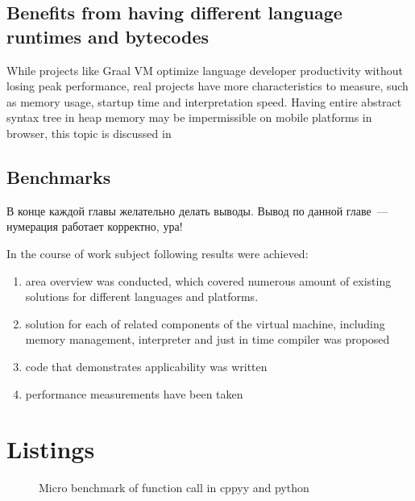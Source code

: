 \documentclass[times, %
	specification,annotation, %
	titlepage-extra-ru,specification-extra-ru,annotation-extra-ru, %
	languages={russian,english} %
	]{itmo-student-thesis}
\begin{document}
\section{Benefits from having different language runtimes and bytecodes}
While projects like Graal VM optimize language developer productivity without losing peak performance, real projects have more characteristics to measure, such as memory usage, startup time and interpretation speed. Having entire abstract syntax tree in heap memory may be impermissible on mobile platforms in browser, this topic is discussed in \cite{ignition-iterpreter}

\section{Benchmarks}
\TODO

\chapterconclusion

В конце каждой главы желательно делать выводы. Вывод по данной главе~--- нумерация работает корректно, ура!

\startconclusionpage
In the course of work subject following results were achieved:
\begin{enumerate}
	\item area overview was conducted, which covered numerous amount of existing solutions for different languages and platforms.
	\item solution for each of related components of the virtual machine, including memory management, interpreter and just in time compiler was proposed
	\item code that demonstrates applicability was written
	\item performance measurements have been taken\TODO
\end{enumerate}


\printmainbibliography

\appendix

\chapter{Listings}
\begin{figure}[!h]
	\caption{Micro benchmark of function call in cppyy and python}\label{apx:cppyy-bench}
	
\end{figure}
\end{document}

